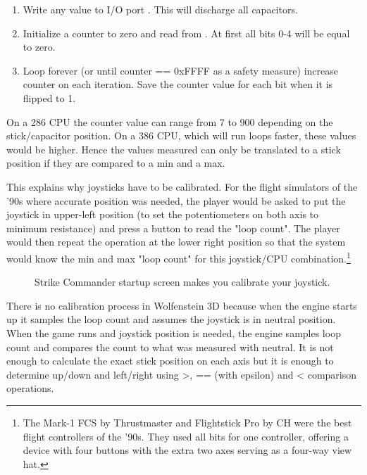 \begin{enumerate}
 \item Write  any value to I/O port . This will discharge all capacitors.
 \item Initialize a counter to zero and read  from . At first all bits 0-4 will be equal to zero.
 \item Loop forever (or until counter == 0xFFFF as a safety measure) increase counter on each iteration. Save the counter value for each bit when it is flipped to 1.
\end{enumerate}
\par
On a 286 CPU the counter value can range from 7 to 900 depending on the stick/capacitor position. On a 386 CPU, which will run loops faster, these values would be higher. Hence the values measured can only be translated to a stick position if they are compared to a min and a max.\\
\par 
This explains why joysticks have to be calibrated. For the flight simulators of the '90s where accurate position was needed, the player would be asked to put the joystick in upper-left position (to set the potentiometers on both axis to minimum resistance) and press a button to read the "loop count". The player would then repeat the operation at the lower right position so that the system  would know the min and max "loop count" for this joystick/CPU combination.\footnote{The Mark-1 FCS by Thrustmaster and Flightstick Pro by CH were the best flight controllers of the '90s. They used all bits for one controller, offering a device with four buttons with the extra two axes serving as a four-way view hat.}\\
\par
\begin{figure}[H]
\centering
{}
\caption{Strike Commander startup screen makes you calibrate your joystick.}
\end{figure}
\par
There is no calibration process in Wolfenstein 3D because when the engine starts up it samples the loop count and assumes the joystick is in neutral position. When the game runs and joystick position is needed, the engine samples loop count and compares the count to what was measured with neutral. It is not enough to calculate the exact stick position on each axis but it is enough to determine up/down and left/right using >, == (with epsilon) and < comparison operations.
